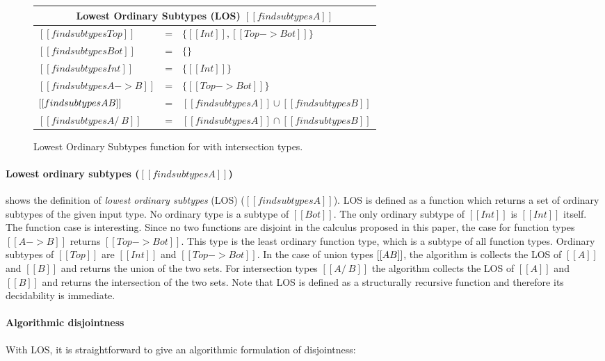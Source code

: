 \begin{figure}[t]
    \centering
    {\renewcommand{\arraystretch}{1.2}
    \begin{tabular}{|lcl|}
      \multicolumn{3}{c}{Lowest Ordinary Subtypes (LOS) $[[findsubtypes A]]$} \\
      \hline
     $[[findsubtypes Top]]$ & = & $\{ [[Int]], [[Top -> Bot]]\}$  \\
     $[[findsubtypes Bot]]$ & = & $\{\}$  \\
     $[[findsubtypes Int]]$ & = & $\{ [[Int]] \}$  \\
     $[[findsubtypes A -> B]]$ & = & $\{ [[Top -> Bot]] \}$  \\
     $[[findsubtypes A \/ B]]$ & = & $ [[findsubtypes A]] \cup [[findsubtypes B]] $\\
     $[[findsubtypes A /\ B]]$ & = & $ [[findsubtypes A]] \cap [[findsubtypes B]] $\\
      \hline
    \end{tabular} }
  \caption{Lowest Ordinary Subtypes function for \cal with intersection types.}
  \label{fig:inter:los}
\end{figure}


\paragraph{Lowest ordinary subtypes ($[[findsubtypes A]]$)}
 shows the definition of
\emph{lowest ordinary subtypes} (LOS) ($[[findsubtypes A]]$).
LOS is defined as a function which
returns a set of ordinary subtypes of the given input type. 
No ordinary type is a subtype of $[[Bot]]$. The only ordinary
subtype of $[[Int]]$ is $[[Int]]$ itself. The function case is
interesting. Since no two functions are disjoint in the calculus
proposed in this paper, the case for function types $[[A -> B]]$ returns $[[Top
    -> Bot]]$. This type is the least ordinary function type, which is a subtype
of all function types.
Ordinary
subtypes of $[[Top]]$ are $[[Int]]$ and $[[Top -> Bot]]$.
In the case of union types $[[A \/ B]]$, the
algorithm is collects the LOS of $[[A]]$ and $[[B]]$ and returns the union of the
two sets. For intersection types $[[A
    /\ B]]$ the algorithm collects the LOS of $[[A]]$ and $[[B]]$
and returns the intersection of the two sets.
Note that LOS is defined as a structurally recursive function and therefore
its decidability is immediate.

\paragraph{Algorithmic disjointness}
With LOS, it is straightforward to give an algorithmic formulation of
disjointness:

